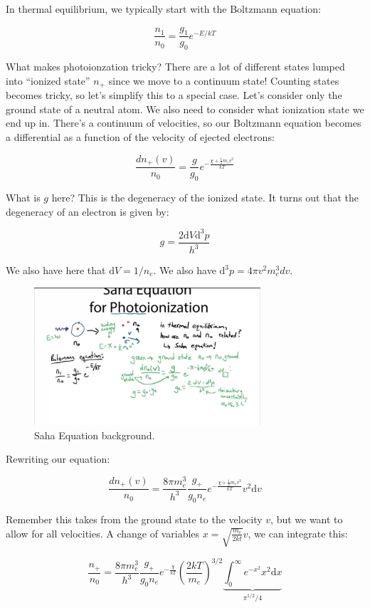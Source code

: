 \documentclass{article}
\begin{document}
In thermal equilibrium, we typically start with the Boltzmann equation:

$$
\frac{n_1}{n_0} = \frac{g_1}{g_0} e^{-E/kT}
$$

What makes photoionzation tricky? There are a lot of different states lumped into ``ionized state'' $n_+$ since we move to a continuum state! Counting states becomes tricky, so let's simplify this to a special case. Let's consider only the ground state of a neutral atom. We also need to consider what ionization state we end up in. There's a continuum of velocities, so our Boltzmann equation becomes a differential as a function of the velocity of ejected electrons:

$$
\frac{d n_+ (v)}{n_0} = \frac{g}{g_0 }e^{-\frac{\chi + \frac12 m_e v^2}{kT}}
$$

What is $g$ here? This is the degeneracy of the ionized state. It turns out that the degeneracy of an electron is given by:

$$
g = \frac{2 \mathrm{d}V \mathrm{d}^3 p}{h^3}
$$

We also have here that $\mathrm{d}V = 1/n_e$. We also have $\mathrm{d}^3 p = 4\pi v^2 m_e^3 dv$.

\begin{figure}
    \centering
    \includegraphics[width=0.75\textwidth]{Screen Shot 2020-10-18 at 9.01.00 PM.png}
    \caption{Saha Equation background.}
    \label{fig:saha}
\end{figure}

Rewriting our equation:

$$
\frac{d n_+ (v)}{n_0} = \frac{8\pi m_e^3}{h^3 }\frac{g_+}{g_0 n_e }e^{-\frac{\chi + \frac12 m_e v^2}{kT}} v^2 \mathrm{d}v
$$

Remember this takes from the ground state to the velocity $v$, but we want to allow for all velocities. A change of variables $x = \sqrt{\frac{m_e}{2kt}}v$, we can integrate this:

$$
\frac{n_+}{n_0} = \frac{8\pi m_e^3}{h^3 }\frac{g_+}{g_0 n_e } e^{-\frac{\chi}{kT}} \left(\frac{2kT}{m_e}\right)^{3/2} \underbrace{\int_0^{\infty} e^{-x^2} x^2 \mathrm{d} x}_{\pi^{1/2}/4}
$$
\end{document}
